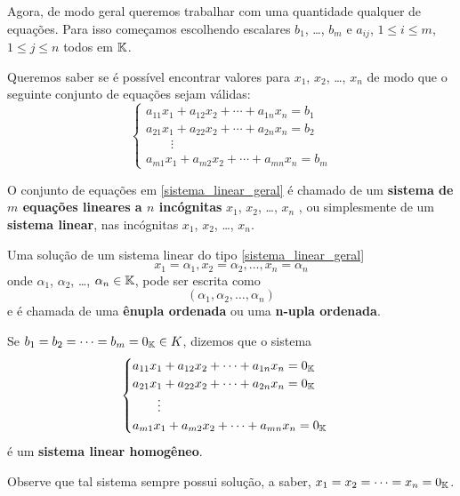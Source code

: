 Agora, de modo geral queremos trabalhar com uma quantidade qualquer de equações. Para isso começamos escolhendo escalares $b_1$, \dots, $b_m$  e $a_{ij}$,  $1 \le i \le m$, $1 \le j \le n$ todos em $\mathbb{K}$.

Queremos saber se é possível encontrar valores para  $x_1$, $x_2$, \dots, $x_n$  de modo que o seguinte conjunto de equações sejam válidas: 
\begin{equation}\label{sistema_linear_geral}
\begin{cases}
        a_{11}x_1 + a_{12}x_2 + \cdots + a_{1n}x_n = b_1\\
        a_{21}x_1 + a_{22}x_2 + \cdots + a_{2n}x_n = b_2\\
        \qquad \vdots\\
        a_{m1}x_1 + a_{m2}x_2 + \cdots + a_{mn}x_n = b_m
    \end{cases}
\end{equation}

O conjunto de equações em \eqref{sistema_linear_geral} é chamado de um  \textbf{sistema de $m$ equa\c{c}\~oes lineares  a $n$ inc\'ognitas} $x_1$, $x_2$, \dots, $x_n$ , ou simplesmente de um \textbf{sistema linear}, nas incógnitas  $x_1$, $x_2$, \dots, $x_n$.

Uma solução de um sistema linear do tipo \eqref{sistema_linear_geral}
\[
    x_1 = \alpha_1,  x_2 = \alpha_2,  \dots, x_n = \alpha_n
\]
onde $\alpha_1$, $\alpha_2$, \dots, $\alpha_n \in \mathbb{K}$,  pode ser escrita como
\[
    (\alpha_1, \alpha_2, \dots, \alpha_n)
\]
e é chamada de uma \textbf{ênupla ordenada} ou uma \textbf{n-upla ordenada}.


Se $b_1 = b_2 = \cdots = b_m = 0_{\mathbb{K}} \in K$,  dizemos que o sistema
\begin{equation}\label{sistemalinearhomogeneo}\index{Sistema Linear}
    \begin{cases}
        a_{11}x_1 + a_{12}x_2 + \cdots + a_{1n}x_n = 0_\cp{K}\\
        a_{21}x_1 + a_{22}x_2 + \cdots + a_{2n}x_n = 0_\cp{K}\\
        \qquad \vdots\\
        a_{m1}x_1 + a_{m2}x_2 + \cdots + a_{mn}x_n = 0_\cp{K}
    \end{cases}
\end{equation}
\'e um \textbf{sistema linear homog\^eneo}. 

Observe que tal sistema sempre possui solu\c{c}\~ao,  a saber, $x_1 = x_2 = \cdots = x_n = 0_{\mathbb{K}}$.

